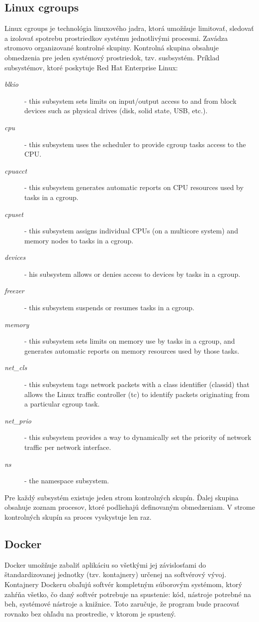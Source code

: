 \documentclass[11pt,final,oneside]{fithesis}
\begin{document}
\subsection{Linux cgroups}
Linux cgroups je technológia linuxového jadra, ktorá umožňuje limitovať, sledovať a izolovať spotrebu prostriedkov systému jednotlivými procesmi. Zavádza stromovo organizované kontrolné skupiny. 
Kontrolná skupina obsahuje obmedzenia pre jeden systémový prostriedok, tzv. susbsystém. Príklad subsystémov, ktoré poskytuje Red Hat Enterprise Linux: 
\begin{description}
\item[\emph{blkio}] - this subsystem sets limits on input/output access to and from block devices such as physical drives (disk, solid state, USB, etc.).
\item[\emph{cpu}] - this subsystem uses the scheduler to provide cgroup tasks access to the CPU.
\item[\emph{cpuacct}] - this subsystem generates automatic reports on CPU resources used by tasks in a cgroup.
\item[\emph{cpuset}] - this subsystem assigns individual CPUs (on a multicore system) and memory nodes to tasks in a cgroup.
\item[\emph{devices}] - his subsystem allows or denies access to devices by tasks in a cgroup.
\item[\emph{freezer}] - this subsystem suspends or resumes tasks in a cgroup.
\item[\emph{memory}] - this subsystem sets limits on memory use by tasks in a cgroup, and generates automatic reports on memory resources used by those tasks.
\item[\emph{net_cls}] - this subsystem tags network packets with a class identifier (classid) that allows the Linux traffic controller (tc) to identify packets originating from a particular cgroup task.
\item[\emph{net_prio}] - this subsystem provides a way to dynamically set the priority of network traffic per network interface.
\item[\emph{ns}] - the namespace subsystem.
\end{description}

Pre každý subsystém existuje jeden strom kontrolných skupín. Ďalej skupina obsahuje zoznam procesov, ktoré podliehajú definovaným obmedzeniam. V strome kontrolných skupín sa proces vyskystuje len raz.


\subsection{Docker}
Docker umožňuje zabaliť aplikáciu so všetkými jej závislosťami do štandardizovanej jednotky (tzv. kontajnery) určenej na softvérový vývoj. Kontajnery Dockeru obaľujú softvér kompletným súborovým systémom, ktorý
zahŕňa všetko, čo daný softvér potrebuje na spustenie: kód, nástroje potrebné na beh, systémové nástroje a knižnice. Toto zaručuje, že program bude pracovať rovnako bez ohľadu na prostredie, v ktorom
je spustený.\cite{docker}
\end{document}
